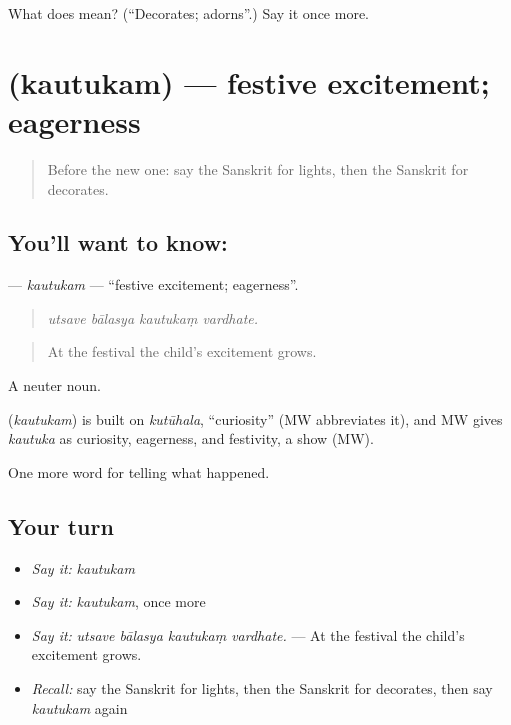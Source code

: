 \begin{tcolorbox}[breakable,colback=teal!4,colframe=teal!35!black,title={Before you move on}]
What does  mean? (\textquotedblleft{}Decorates; adorns\textquotedblright{}.) Say it once more.
\end{tcolorbox}
\section[\texorpdfstring{\sk{कौतुकम्} (kautukam)}{कौतुकम् (kautukam)}]{ (kautukam) — festive excitement; eagerness}

\label{lesson:SA-C326-kautukam}



\begin{quote}
Before the new one: say the Sanskrit for lights, then the Sanskrit for decorates.
\end{quote}

\subsection*{You'll want to know: }
\textbf{} — \emph{kautukam} — \textquotedblleft{}festive excitement; eagerness\textquotedblright{}.

\begin{quote}
   
\end{quote}

\begin{quote}
\emph{utsave bālasya kautukaṃ vardhate.}
\end{quote}

\begin{quote}
At the festival the child's excitement grows.
\end{quote}

A neuter noun.

\begin{cousinweb}
\textbf{} (\emph{kautukam}) is built on \emph{kutūhala}, \textquotedblleft{}curiosity\textquotedblright{} (MW abbreviates it), and MW gives \emph{kautuka} as curiosity, eagerness, and festivity, a show (MW).
\end{cousinweb}

\begin{grammarlens}[title={What you've built}]
One more word for telling what happened.
\end{grammarlens}

\subsection*{Your turn}
\begin{itemize}
\raggedright
  \item \emph{Say it:} \emph{kautukam}
  \item \emph{Say it:} \emph{kautukam}, once more
  \item \emph{Say it:} \emph{utsave bālasya kautukaṃ vardhate.} — At the festival the child's excitement grows.
  \item \emph{Recall:} say the Sanskrit for lights, then the Sanskrit for decorates, then say \emph{kautukam} again
\end{itemize}

